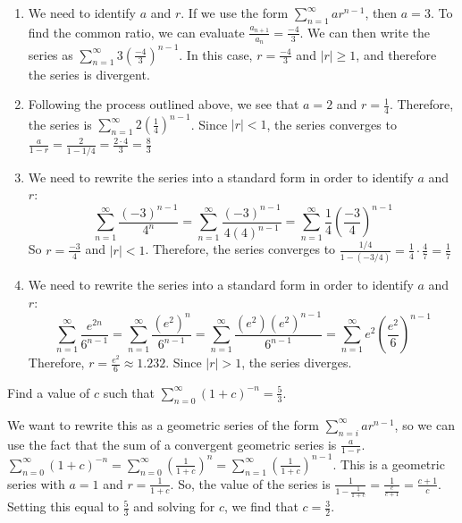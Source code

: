 \begin{Answer}[ref = geo1]
\begin{enumerate}
\item We need to identify $a$ and $r$. If we use the form $\sum_{n=1}^\infty 
ar^{n-1}$, then $a = 3$. To find the common ratio, we can evaluate $\frac{a_
{n+1}}{a_n} = \frac{-4}{3}$. We can then write the series as $\sum_{n=1}^\infty 
3 \left( \frac{-4}{3} \right)^{n-1}$. In this case, $r = \frac{-4}{3}$ and $|r| 
\geq 1$, and therefore the series is divergent. 
\item Following the process outlined above, we see that $a = 2$ and $r = 
\frac{1}{4}$. Therefore, the series is $\sum_{n=1}^\infty 2 \left( \frac{1}{4} 
\right)^{n-1}$. Since $|r| < 1$, the series converges to $\frac{a}{1-r} = 
\frac{2}{1-1/4} = \frac{2 \cdot 4}{3} = \frac{8}{3}$
\item We need to rewrite the series into a standard form in order to identify 
$a$ and $r$:
$$\sum_{n=1}^\infty \frac{(-3)^{n-1}}{4^n} = \sum_{n=1}^\infty \frac{(-3)^
{n-1}}{4(4)^{n-1}} = \sum_{n=1}^\infty \frac{1}{4} \left( \frac{-3}{4} \right)
^{n-1}$$
So $r = \frac{-3}{4}$ and $|r| < 1$. Therefore, the series converges to 
$\frac{1/4}{1 - (-3/4)} = \frac{1}{4} \cdot \frac{4}{7} = \frac{1}{7}$
\item We need to rewrite the series into a standard form in order to identify 
$a$ and $r$:
$$\sum_{n=1}^\infty \frac{e^{2n}}{6^{n-1}} = \sum_{n=1}^\infty \frac{(e^2)^n}
{6^{n-1}} = \sum_{n=1}^\infty \frac{(e^2)(e^2)^{n-1}}{6^{n-1}} = \sum_{n=1}^
\infty e^2 \left( \frac{e^2}{6} \right)^{n-1}$$
Therefore, $r = \frac{e^2}{6} \approx 1.232$. Since $|r| > 1$, the series 
diverges. 
\end{enumerate}
\end{Answer}

\begin{Exercise}[label = geo2]
Find a value of $c$ such that $\sum_{n=0}^\infty (1 + c)^{-n} = \frac{5}{3}$.
\end{Exercise}

\begin{Answer}[ref = geo2]
We want to rewrite this as a geometric series of the form $\sum_{n=i}^\infty 
ar^{n-1}$, so we can use the fact that the sum of a convergent geometric series 
is $\frac{a}{1-r}$. $\sum_{n=0}^\infty (1 + c)^{-n} = \sum_{n=0}^\infty \left( 
\frac{1}{1+c} \right)^n = \sum_{n=1}^\infty \left( \frac{1}{1 + c} \right)^
{n-1}$. This is a geometric series with $a = 1$ and $r = \frac{1}{1 + c}$. So, 
the value of the series is $\frac{1}{1 - \frac{1}{1+c}} = 
\frac{1}{\frac{c}{c+1}} = \frac{c+1}{c}$. Setting this equal to $\frac{5}{3}$ 
and solving for $c$, we find that $c = \frac{3}{2}$.
\end{Answer}


